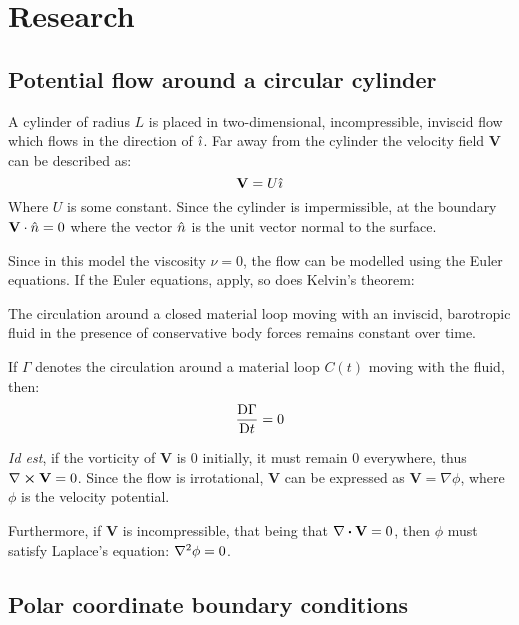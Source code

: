 \newpage
\section{Research}
\subsection{Potential flow around a circular cylinder}
A cylinder of radius $L$ is placed in two-dimensional, incompressible, inviscid flow which flows in the direction of $\hat{\imath}$.
Far away from the cylinder the velocity field $\mathbf{V}$ can be described as: 
\begin{equation}\label{equation:in-infinitum}
	\mathbf{V}=U\hat{\imath}
\end{equation}
Where $U$ is some constant. Since the cylinder is impermissible, at the boundary $\mathbf{V}\cdot\hat{n}=0$ where the vector $\hat{n}$ is the unit vector normal to the surface. 

Since in this model the viscosity $\nu=0$, the flow can be modelled using the Euler equations. If the Euler equations, apply, so does Kelvin's theorem:
\begin{theorem}
	The circulation around a closed material loop moving with an inviscid, barotropic fluid in the presence of conservative body forces remains constant over time.\needcitation
	
	If $\Gamma$ denotes the circulation around a material loop $C(t)$ moving with the fluid, then:
	$$\frac{\mathrm{D} \Gamma}{\mathrm{D} t}=0$$
\end{theorem}

\textit{Id est}, if the vorticity of $\mathbf{V}$ is $0$ initially, it must remain $0$ everywhere, thus $\curl\mathbf{V}=0$. Since the flow is irrotational, $\mathbf{V}$ can be expressed as $\mathbf{V}=\nabla\phi$, where $\phi$ is the velocity potential.

Furthermore, if $\mathbf{V}$ is incompressible, that being that $\divergence\mathbf{V}=0$, then $\phi$ must satisfy Laplace's equation: $\laplacian{\phi}=0$.

\subsection{Polar coordinate boundary conditions}
